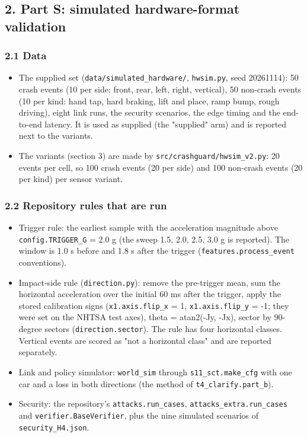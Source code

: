 \subsection*{2. Part S: simulated hardware-format validation}

\subsubsection*{2.1 Data}
\begin{itemize}
\item The supplied set (\texttt{data/simulated\_hardware/}, \texttt{hwsim.py}, seed 20261114): 50 crash events (10 per side: front, rear, left, right, vertical), 50 non-crash events (10 per kind: hand tap, hard braking, lift and place, ramp bump, rough driving), eight link runs, the security scenarios, the edge timing and the end-to-end latency. It is used as supplied (the "supplied" arm) and is reported next to the variants.
\item The variants (section 3) are made by \texttt{src/crashguard/hwsim\_v2.py}: 20 events per cell, so 100 crash events (20 per side) and 100 non-crash events (20 per kind) per sensor variant.
\end{itemize}

\subsubsection*{2.2 Repository rules that are run}
\begin{itemize}
\item Trigger rule: the earliest sample with the acceleration magnitude above \texttt{config.TRIGGER\_G} = 2.0 g (the sweep 1.5, 2.0, 2.5, 3.0 g is reported). The window is 1.0 s before and 1.8 s after the trigger (\texttt{features.process\_event} conventions).
\item Impact-side rule (\texttt{direction.py}): remove the pre-trigger mean, sum the horizontal acceleration over the initial 60 ms after the trigger, apply the stored calibration signs (\texttt{x1.axis.flip\_x} = 1, \texttt{x1.axis.flip\_y} = -1; they were set on the NHTSA test axes), theta = atan2(-Jy, -Jx), sector by 90-degree sectors (\texttt{direction.sector}). The rule has four horizontal classes. Vertical events are scored as "not a horizontal class" and are reported separately.
\item Link and policy simulator: \texttt{world\_sim} through \texttt{s11\_sct.make\_cfg} with one car and a loss in both directions (the method of \texttt{t4\_clarify.part\_b}).
\item Security: the repository's \texttt{attacks.run\_cases}, \texttt{attacks\_extra.run\_cases} and \texttt{verifier.BaseVerifier}, plus the nine simulated scenarios of \texttt{security\_H4.json}.
\end{itemize}


